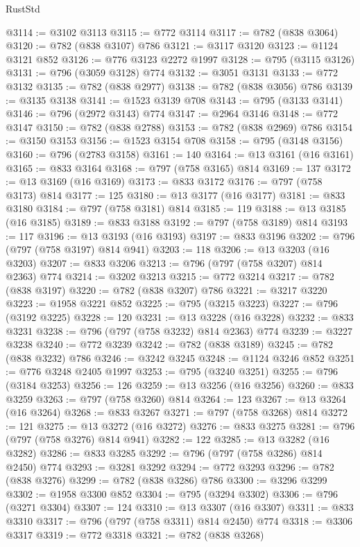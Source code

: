 \begin{lexlean}{RustStd}
\begin{coremodule}
{\begin{coremodule}
{{{{{{{{{{{{{{@3114 := @3102 @3113
@3115 := @772 @3114
@3117 := @782 (@838 @3064)
@3120 := @782 (@838 @3107) @786
@3121 := @3117 @3120
@3123 := @1124 @3121 @852
@3126 := @776 @3123 @2272 @1997
@3128 := @795 (@3115 @3126)
@3131 := @796 (@3059 @3128) @774
@3132 := @3051 @3131
@3133 := @772 @3132
@3135 := @782 (@838 @2977)
@3138 := @782 (@838 @3056) @786
@3139 := @3135 @3138
@3141 := @1523 @3139 @708
@3143 := @795 (@3133 @3141)
@3146 := @796 (@2972 @3143) @774
@3147 := @2964 @3146
@3148 := @772 @3147
@3150 := @782 (@838 @2788)
@3153 := @782 (@838 @2969) @786
@3154 := @3150 @3153
@3156 := @1523 @3154 @708
@3158 := @795 (@3148 @3156)
@3160 := @796 (@2783 @3158)
@3161 := 140
@3164 := @13 @3161 (@16 @3161)
@3165 := @833 @3164
@3168 := @797 (@758 @3165) @814
@3169 := 137
@3172 := @13 @3169 (@16 @3169)
@3173 := @833 @3172
@3176 := @797 (@758 @3173) @814
@3177 := 125
@3180 := @13 @3177 (@16 @3177)
@3181 := @833 @3180
@3184 := @797 (@758 @3181) @814
@3185 := 119
@3188 := @13 @3185 (@16 @3185)
@3189 := @833 @3188
@3192 := @797 (@758 @3189) @814
@3193 := 117
@3196 := @13 @3193 (@16 @3193)
@3197 := @833 @3196
@3202 := @796 (@797 (@758 @3197) @814 @941)
@3203 := 118
@3206 := @13 @3203 (@16 @3203)
@3207 := @833 @3206
@3213 := @796 (@797 (@758 @3207) @814 @2363) @774
@3214 := @3202 @3213
@3215 := @772 @3214
@3217 := @782 (@838 @3197)
@3220 := @782 (@838 @3207) @786
@3221 := @3217 @3220
@3223 := @1958 @3221 @852
@3225 := @795 (@3215 @3223)
@3227 := @796 (@3192 @3225)
@3228 := 120
@3231 := @13 @3228 (@16 @3228)
@3232 := @833 @3231
@3238 := @796 (@797 (@758 @3232) @814 @2363) @774
@3239 := @3227 @3238
@3240 := @772 @3239
@3242 := @782 (@838 @3189)
@3245 := @782 (@838 @3232) @786
@3246 := @3242 @3245
@3248 := @1124 @3246 @852
@3251 := @776 @3248 @2405 @1997
@3253 := @795 (@3240 @3251)
@3255 := @796 (@3184 @3253)
@3256 := 126
@3259 := @13 @3256 (@16 @3256)
@3260 := @833 @3259
@3263 := @797 (@758 @3260) @814
@3264 := 123
@3267 := @13 @3264 (@16 @3264)
@3268 := @833 @3267
@3271 := @797 (@758 @3268) @814
@3272 := 121
@3275 := @13 @3272 (@16 @3272)
@3276 := @833 @3275
@3281 := @796 (@797 (@758 @3276) @814 @941)
@3282 := 122
@3285 := @13 @3282 (@16 @3282)
@3286 := @833 @3285
@3292 := @796 (@797 (@758 @3286) @814 @2450) @774
@3293 := @3281 @3292
@3294 := @772 @3293
@3296 := @782 (@838 @3276)
@3299 := @782 (@838 @3286) @786
@3300 := @3296 @3299
@3302 := @1958 @3300 @852
@3304 := @795 (@3294 @3302)
@3306 := @796 (@3271 @3304)
@3307 := 124
@3310 := @13 @3307 (@16 @3307)
@3311 := @833 @3310
@3317 := @796 (@797 (@758 @3311) @814 @2450) @774
@3318 := @3306 @3317
@3319 := @772 @3318
@3321 := @782 (@838 @3268)
}}}}}}}}}}}}}}
\end{coremodule}}
\end{coremodule}
\end{lexlean}
